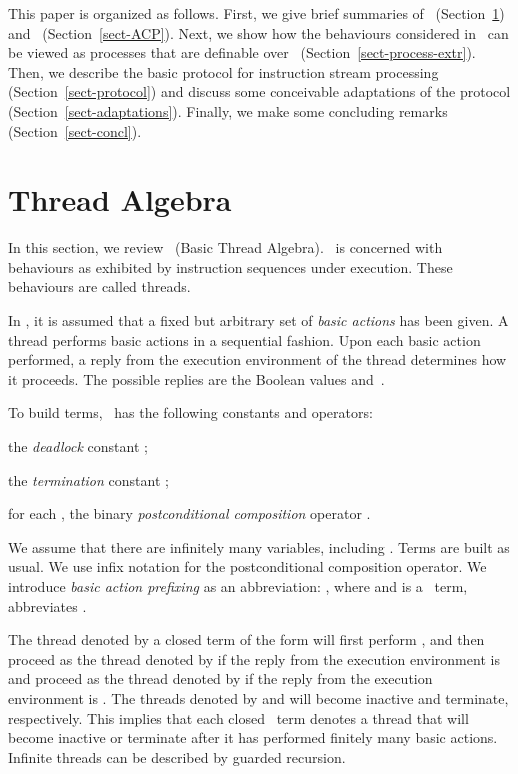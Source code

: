 \documentclass[fleqn]{llncs}
\begin{document}
This paper is organized as follows.
First, we give brief summaries of \BTA\ (Section~\ref{sect-BTA}) and
\ACPt\ (Section~\ref{sect-ACP}).
Next, we show how the behaviours considered in \BTA\ can be viewed as
processes that are definable over \ACPt\
(Section~\ref{sect-process-extr}).
Then, we describe the basic protocol for instruction stream processing
(Section~\ref{sect-protocol}) and discuss some conceivable adaptations
of the protocol (Section~\ref{sect-adaptations}).
Finally, we make some concluding remarks (Section~\ref{sect-concl}).

\section{Thread Algebra}
\label{sect-BTA}

In this section, we review \BTA\ (Basic Thread Algebra).
\BTA\ is concerned with behaviours as exhibited by instruction sequences
under execution.
These behaviours are called threads.

In \BTA, it is assumed that a fixed but arbitrary set  of
\emph{basic actions} has been given.
A thread performs basic actions in a sequential fashion.
Upon each basic action performed, a reply from the execution environment
of the thread determines how it proceeds.
The possible replies are the Boolean values  and~.

To build terms, \BTA\  has the following constants and operators:
\begin{iteml}
\item
the \emph{deadlock} constant ;
\item
the \emph{termination} constant ;
\item
for each , the binary \emph{postconditional composition}
operator .
\end{iteml}
We assume that there are infinitely many variables, including .
Terms are built as usual.
We use infix notation for the postconditional composition operator.
We introduce \emph{basic action prefixing} as an abbreviation:
, where  and  is a \BTA\ term, abbreviates
.

The thread denoted by a closed term of the form  will
first perform , and then proceed as the thread denoted by 
if the reply from the execution environment is  and proceed as
the thread denoted by  if the reply from the execution environment is
.
The threads denoted by  and  will become inactive and
terminate, respectively.
This implies that each closed \BTA\ term denotes a thread that will
become inactive or terminate after it has performed finitely many
basic actions.
Infinite threads can be described by guarded recursion.
\end{document}
